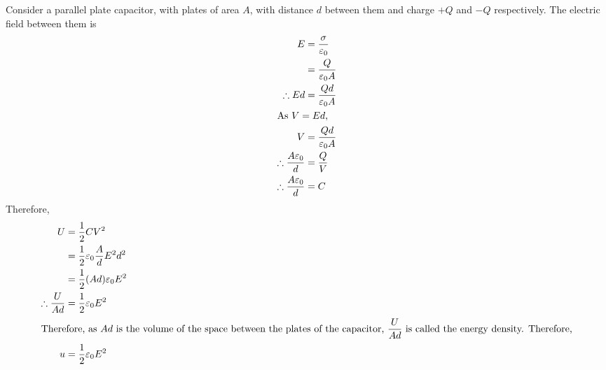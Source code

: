\documentclass[fleqn, a4paper, 12pt, twoside]{article}
\theoremstyle{definition}
\theoremstyle{theorem}
\begin{document}
Consider a parallel plate capacitor, with plates of area $A$, with distance $d$ between them and charge $+Q$ and $-Q$ respectively.
The electric field between them is
\begin{align*}
	E                                     & = \dfrac{\sigma}{\varepsilon_0} \\
                                              & = \dfrac{Q}{\varepsilon_0 A}    \\
	\therefore E d                        & = \dfrac{Q d}{\varepsilon_0 A}  \\
	\intertext{As $V = E d$,}
	V                                     & = \dfrac{Q d}{\varepsilon_0 A}  \\
	\therefore \dfrac{A \varepsilon_0}{d} & = \dfrac{Q}{V}                  \\
	\therefore \dfrac{A \varepsilon_0}{d} & = C
\end{align*}
Therefore,
\begin{align*}
	U                         & = \dfrac{1}{2} C V^2                              \\
                                  & = \dfrac{1}{2} \varepsilon_0 \dfrac{A}{d} E^2 d^2 \\
                                  & = \dfrac{1}{2} (A d) \varepsilon_0 E^2            \\
	\therefore \dfrac{U}{A d} & = \dfrac{1}{2} \varepsilon_0 E^2                  \\
	\intertext{Therefore, as $A d$ is the volume of the space between the plates of the capacitor, $\dfrac{U}{A d}$ is called the energy density. Therefore,}
	u                         & = \dfrac{1}{2} \varepsilon_0 E^2
\end{align*}
\end{document}
